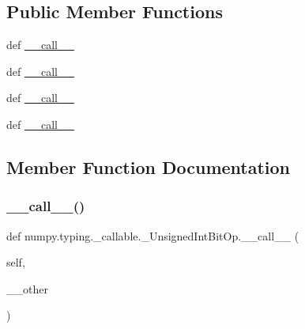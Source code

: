 \subsection*{Public Member Functions}
\begin{DoxyCompactItemize}
\item 
def \hyperlink{classnumpy_1_1typing_1_1__callable_1_1__UnsignedIntBitOp_a8cc15f5fc934a591bdcab0c0f20121cb}{\+\_\+\+\_\+call\+\_\+\+\_\+}
\item 
def \hyperlink{classnumpy_1_1typing_1_1__callable_1_1__UnsignedIntBitOp_a8cc15f5fc934a591bdcab0c0f20121cb}{\+\_\+\+\_\+call\+\_\+\+\_\+}
\item 
def \hyperlink{classnumpy_1_1typing_1_1__callable_1_1__UnsignedIntBitOp_a8cc15f5fc934a591bdcab0c0f20121cb}{\+\_\+\+\_\+call\+\_\+\+\_\+}
\item 
def \hyperlink{classnumpy_1_1typing_1_1__callable_1_1__UnsignedIntBitOp_a8cc15f5fc934a591bdcab0c0f20121cb}{\+\_\+\+\_\+call\+\_\+\+\_\+}
\end{DoxyCompactItemize}


\subsection{Member Function Documentation}
\mbox{\label{classnumpy_1_1typing_1_1__callable_1_1__UnsignedIntBitOp_a8cc15f5fc934a591bdcab0c0f20121cb}} 
\subsubsection{\texorpdfstring{\+\_\+\+\_\+call\+\_\+\+\_\+()}{\_\_call\_\_()}\hspace{0.1cm}{\footnotesize\ttfamily [1/4]}}
{\footnotesize\ttfamily def numpy.\+typing.\+\_\+callable.\+\_\+\+Unsigned\+Int\+Bit\+Op.\+\_\+\+\_\+call\+\_\+\+\_\+ (\begin{DoxyParamCaption}\item[{}]{self,  }\item[{}]{\+\_\+\+\_\+other }\end{DoxyParamCaption})}


